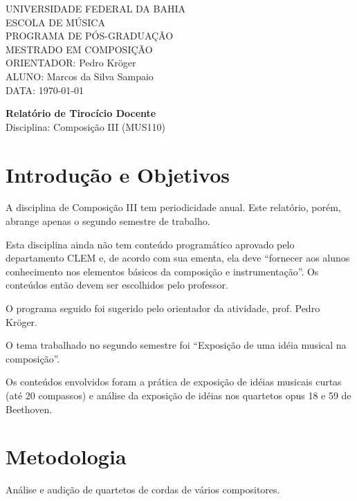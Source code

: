 \documentclass{article}
\begin{document}
\setlength{\parindent}{0cm}

\large
UNIVERSIDADE FEDERAL DA BAHIA \\
ESCOLA DE MÚSICA \\
PROGRAMA DE PÓS-GRADUAÇÃO \\
MESTRADO EM COMPOSIÇÃO \\
ORIENTADOR: Pedro Kröger \\
ALUNO: Marcos da Silva Sampaio \\
DATA: \today

\thispagestyle{empty}
\vspace{1cm}
\begin{center}{
    \Huge \textbf{Relatório de Tirocício Docente} \\
}
\vspace{12pt}
{\Large Disciplina: Composição III (MUS110)}

\end{center}
\vspace{1cm}

\section{Introdução e Objetivos}
\label{sec:introducao}


A disciplina de Composição III tem periodicidade anual. Este
relatório, porém, abrange apenas o segundo semestre de trabalho.

Esta disciplina ainda não tem conteúdo programático aprovado pelo
departamento CLEM e, de acordo com sua ementa, ela deve ``fornecer aos
alunos conhecimento nos elementos básicos da composição e
instrumentação''. Os conteúdos então devem ser escolhidos pelo
professor.

O programa seguido foi sugerido pelo orientador da atividade,
prof. Pedro Kröger.


O tema trabalhado no segundo semestre foi ``Exposição de uma idéia
musical na composição''.

Os conteúdos envolvidos foram a prática de exposição de idéias
musicais curtas (até 20 compassos) e análise da exposição de idéias
nos quartetos opus 18 e 59 de Beethoven.

\section{Metodologia}
\label{sec:metodologia}

Análise e audição de quartetos de cordas de vários compositores.
\end{document}
